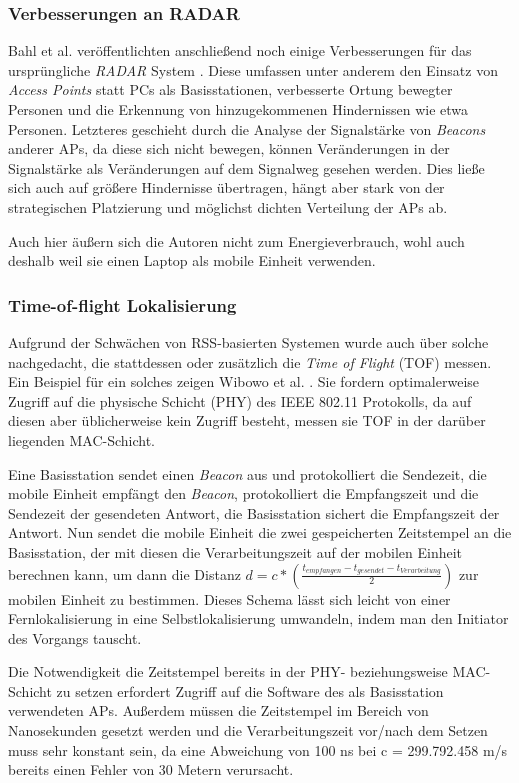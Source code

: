 \subsubsection{Verbesserungen an RADAR}
Bahl et al. veröffentlichten anschließend noch einige Verbesserungen für das ursprüngliche \emph{RADAR} System \cite{bahl2000enhancements}.
Diese umfassen unter anderem den Einsatz von \emph{Access Points} statt PCs als Basisstationen, verbesserte Ortung bewegter Personen und die Erkennung von hinzugekommenen Hindernissen wie etwa Personen.
Letzteres geschieht durch die Analyse der Signalstärke von \emph{Beacons} anderer APs, da diese sich nicht bewegen, können Veränderungen in der Signalstärke als Veränderungen auf dem Signalweg gesehen werden.
Dies ließe sich auch auf größere Hindernisse übertragen, hängt aber stark von der strategischen Platzierung und möglichst dichten Verteilung der APs ab.

Auch hier äußern sich die Autoren nicht zum Energieverbrauch, wohl auch deshalb weil sie einen Laptop als mobile Einheit verwenden.

\subsubsection{Time-of-flight Lokalisierung}
\label{ch:Vorherige:sec:TOF}
Aufgrund der Schwächen von RSS-basierten Systemen wurde auch über solche nachgedacht, die stattdessen oder zusätzlich die \emph{Time of Flight} (TOF) messen. 
Ein Beispiel für ein solches zeigen Wibowo et al. \cite{wibowo2009time}. 
Sie fordern optimalerweise Zugriff auf die physische Schicht (PHY) des IEEE 802.11 Protokolls, da auf diesen aber üblicherweise kein Zugriff besteht, messen sie TOF in der darüber liegenden MAC-Schicht.

Eine Basisstation sendet einen \emph{Beacon} aus und protokolliert die Sendezeit, die mobile Einheit empfängt den \emph{Beacon}, protokolliert die Empfangszeit und die Sendezeit der gesendeten Antwort, die Basisstation sichert die Empfangszeit der Antwort.
Nun sendet die mobile Einheit die zwei gespeicherten Zeitstempel an die Basisstation, der mit diesen die Verarbeitungszeit auf der mobilen Einheit berechnen kann, um dann die Distanz $d = c * (\frac{t_{empfangen} - t_{gesendet} - t_{Verarbeitung}}{2})$ zur mobilen Einheit zu bestimmen.
Dieses Schema lässt sich leicht von einer Fernlokalisierung in eine Selbstlokalisierung umwandeln, indem man den Initiator des Vorgangs tauscht.

Die Notwendigkeit die Zeitstempel bereits in der PHY- beziehungsweise MAC-Schicht zu setzen erfordert Zugriff auf die Software des als Basisstation verwendeten APs. 
Außerdem müssen die Zeitstempel im Bereich von Nanosekunden gesetzt werden und die Verarbeitungszeit vor/nach dem Setzen muss sehr konstant sein, da eine Abweichung von 100 ns bei c = 299.792.458 m/s bereits einen Fehler von 30 Metern verursacht.

